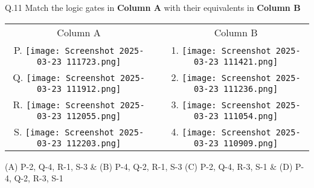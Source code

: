 \documentclass[12pt]{article}
\begin{document}
\item Q.11 Match the logic gates in \textbf{Column A} with their equivalents in \textbf{Column B}

\begin{center}
    \begin{tabular}{c c c}
        {Column A} & & {Column B} \\
        P. \texttt{[image: Screenshot 2025-03-23 111723.png]}} & & 1. \texttt{[image: Screenshot 2025-03-23 111421.png]} \\
        Q. \texttt{[image: Screenshot 2025-03-23 111912.png]} &  & 2. \texttt{[image: Screenshot 2025-03-23 111236.png]} \\
        R. \texttt{[image: Screenshot 2025-03-23 112055.png]} &  & 3. \texttt{[image: Screenshot 2025-03-23 111054.png]} \\
        S. \texttt{[image: Screenshot 2025-03-23 112203.png]} &  & 4. \texttt{[image: Screenshot 2025-03-23 110909.png]} \\
    \end{tabular}
\end{center}

\vspace{1cm}
\begin{enumerate}
    (A) P-2, Q-4, R-1, S-3 & \hspace{2.5cm} (B) P-4, Q-2, R-1, S-3 
    \newline
    (C) P-2, Q-4, R-3, S-1 &  \hspace{2.5cm} (D) P-4, Q-2, R-3, S-1
\end{enumerate}
\end{document}

